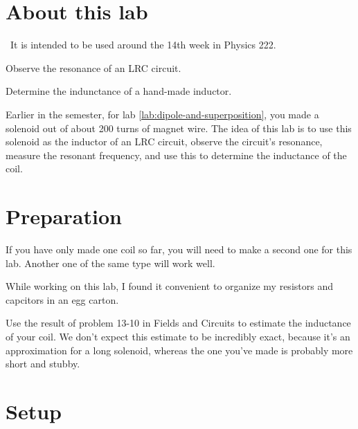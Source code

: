 \renewcommand\thechapter{c2.14}
\label{lab:ac-circuits}

\section*{About this lab}

\covid\ 
It is intended to be used around the 14th week in Physics 222.

\apparatus
{}

\begin{goals}

\item[] Observe the resonance of an LRC circuit.

\item[] Determine the indunctance of a hand-made inductor.
\end{goals}

\introduction

Earlier in the semester, for lab \ref{lab:dipole-and-superposition}, you 
made a solenoid out of about 200 turns of magnet wire. The idea of this
lab is to use this solenoid as the inductor of an LRC circuit, observe
the circuit's resonance, measure the resonant frequency, and use this
to determine the inductance of the coil.

\section*{Preparation}

If you have only made one coil so far, you will need to make a second one
for this lab. Another one of the same type will work well.

While working on this lab, I found it convenient to organize my resistors
and capcitors in an egg carton.

Use the result of problem 13-10 in Fields and Circuits to estimate the
inductance of your coil. We don't expect this estimate to be incredibly
exact, because it's an approximation for a long solenoid, whereas the
one you've made is probably more short and stubby.

\section*{Setup}

